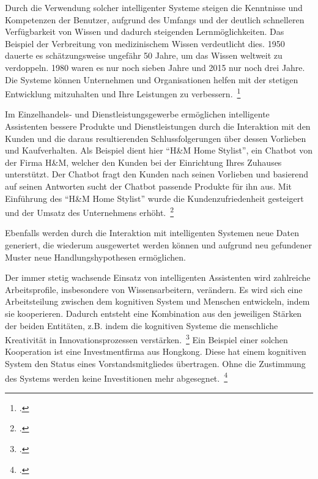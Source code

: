 Durch die Verwendung solcher intelligenter Systeme steigen die Kenntnisse und Kompetenzen der Benutzer, aufgrund des Umfangs und der deutlich schnelleren Verfügbarkeit
von Wissen und dadurch steigenden Lernmöglichkeiten. Das Beispiel der Verbreitung von medizinischem Wissen verdeutlicht dies. 1950 
dauerte es schätzungsweise ungefähr 50 Jahre, um das Wissen weltweit zu verdoppeln. 1980 waren es nur noch sieben Jahre und 2015 nur noch drei Jahre.
Die Systeme können Unternehmen und Organisationen helfen mit der stetigen Entwicklung mitzuhalten und Ihre Leistungen zu verbessern.~\footcite[\vglf][]{Scherk.2017}

Im Einzelhandels- und Dienstleistungsgewerbe ermöglichen intelligente Assistenten bessere Produkte und Dienstleistungen durch die Interaktion mit den Kunden 
und die daraus resultierenden Schlussfolgerungen über dessen Vorlieben und Kaufverhalten.
Als Beispiel dient hier \enquote{H\&M Home Stylist}, ein Chatbot von der Firma H\&M, welcher den Kunden bei der Einrichtung Ihres Zuhauses unterstützt. Der Chatbot 
fragt den Kunden nach seinen Vorlieben und basierend auf seinen Antworten sucht der Chatbot passende Produkte für ihn aus. Mit Einführung des \enquote{H\&M Home Stylist}
wurde die Kundenzufriedenheit gesteigert und der Umsatz des Unternehmens erhöht.~\footcite[\vglf][]{Robot.2023}

Ebenfalls werden durch die Interaktion mit intelligenten Systemen neue Daten generiert, die wiederum ausgewertet werden können und aufgrund neu gefundener Muster neue Handlungshypothesen
ermöglichen.

Der immer stetig wachsende Einsatz von intelligenten Assistenten wird zahlreiche Arbeitsprofile, insbesondere von Wissensarbeitern, verändern. Es wird sich eine Arbeitsteilung 
zwischen dem kognitiven System und Menschen entwickeln, indem sie kooperieren. Dadurch entsteht eine Kombination aus den jeweiligen Stärken der beiden Entitäten, z.B. indem
die kognitiven Systeme die menschliche Kreativität in Innovationsprozessen verstärken.~\footcite[\vglf][]{Scherk.2017}
Ein Beispiel einer solchen Kooperation ist eine Investmentfirma aus Hongkong. Diese hat einem kognitiven System den Status eines Vorstandsmitgliedes übertragen. Ohne die Zustimmung
des Systems werden keine Investitionen mehr abgesegnet.~\footcite[\vglf][]{Scherk.2017}

